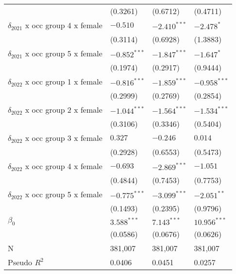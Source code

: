 \begin{tabular}{llll}
                                       &           (0.3261) &           (0.6712) &           (0.4711) \\
$\delta_{2021}$ x occ group 4 x female &           $-0.510$ &     $-2.410^{***}$ &         $-2.478^*$ \\
                                       &           (0.3114) &           (0.6928) &           (1.3883) \\
$\delta_{2021}$ x occ group 5 x female &     $-0.852^{***}$ &     $-1.847^{***}$ &         $-1.647^*$ \\
                                       &           (0.1974) &           (0.2917) &           (0.9444) \\
$\delta_{2022}$ x occ group 1 x female &     $-0.816^{***}$ &     $-1.859^{***}$ &     $-0.958^{***}$ \\
                                       &           (0.2999) &           (0.2769) &           (0.2854) \\
$\delta_{2022}$ x occ group 2 x female &     $-1.044^{***}$ &     $-1.564^{***}$ &     $-1.534^{***}$ \\
                                       &           (0.3106) &           (0.3346) &           (0.5404) \\
$\delta_{2022}$ x occ group 3 x female &            $0.327$ &           $-0.246$ &            $0.014$ \\
                                       &           (0.2928) &           (0.6553) &           (0.5473) \\
$\delta_{2022}$ x occ group 4 x female &           $-0.693$ &     $-2.869^{***}$ &           $-1.051$ \\
                                       &           (0.4844) &           (0.7453) &           (0.7753) \\
$\delta_{2022}$ x occ group 5 x female &     $-0.775^{***}$ &     $-3.099^{***}$ &      $-2.051^{**}$ \\
                                       &           (0.1493) &           (0.2395) &           (0.9796) \\
$\beta_0$                              &      $3.588^{***}$ &      $7.143^{***}$ &     $10.956^{***}$ \\
                                       &           (0.0586) &           (0.0676) &           (0.0626) \\
N                                      &            381,007 &            381,007 &            381,007 \\
Pseudo $R^2$                           &             0.0406 &             0.0451 &             0.0257 \\
\bottomrule
\end{tabular}

